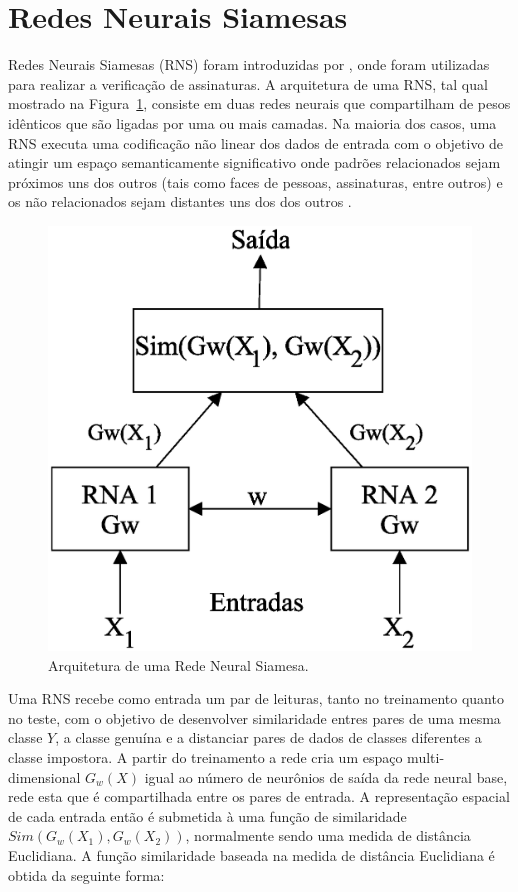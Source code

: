 \documentclass[conference,harvard,brazil,english]{sbatex}
\begin{document}
\section{Redes Neurais Siamesas} \label{sec:siamese}
    
Redes Neurais Siamesas (RNS) foram introduzidas por \cite{bromley1994}, onde foram utilizadas para realizar a verificação de assinaturas. A arquitetura de uma RNS, tal qual mostrado na Figura~\ref{fig:siamese}, consiste em duas redes neurais que compartilham de pesos idênticos que são ligadas por uma ou mais camadas. Na maioria dos casos, uma RNS executa uma codificação não linear dos dados de entrada com o objetivo de atingir um espaço semanticamente significativo onde padrões relacionados sejam próximos uns dos outros (tais como faces de pessoas, assinaturas, entre outros) e os não relacionados sejam distantes uns dos dos outros \cite{Harandi}.

\begin{figure}[ht]
\centering
\includegraphics[width=.35\textwidth]{im1.eps}
\caption{Arquitetura de uma Rede Neural Siamesa.}
\label{fig:siamese}
\end{figure}

Uma RNS recebe como entrada um par de leituras, tanto no treinamento quanto no teste, com o objetivo de desenvolver similaridade entres pares de uma mesma classe $Y$, a classe genuína e a distanciar pares de dados de classes diferentes a classe impostora. A partir do treinamento a rede cria um espaço multi-dimensional $G_w(X)$ igual ao número de neurônios de saída da rede neural base, rede esta que é compartilhada entre os pares de entrada. A representação espacial de cada entrada então é submetida à uma função de similaridade $Sim(G_w(X_1), G_w(X_2))$, normalmente sendo uma medida de distância Euclidiana. A função  similaridade baseada na medida de distância Euclidiana é obtida da seguinte forma:
\end{document}
